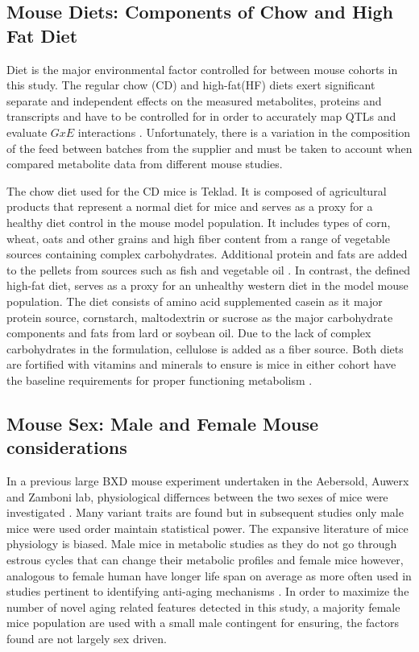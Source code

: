 \documentclass[a4paper,11pt,twoside]{book}
\begin{document}
	\subsection{Mouse Diets: Components of Chow and High Fat Diet}
	
    Diet is the major environmental factor controlled for between mouse cohorts in this study. The regular chow (CD) and high-fat(HF) diets exert significant separate and independent effects on the measured metabolites, proteins and transcripts and have to be controlled for in order to accurately map QTLs and evaluate $GxE$ interactions \citep{Warden2008}. Unfortunately, there is a variation in the composition of the feed between batches from the supplier and must be taken to account when compared metabolite data from different mouse studies.

	The chow diet used for the CD mice is Teklad. It is composed of agricultural products that represent a normal diet for mice and serves as a proxy for a healthy diet control in the mouse model population. It includes types of corn, wheat, oats and other grains and high fiber content from a range of vegetable sources containing complex carbohydrates\citep{Warden2008}. Additional protein and fats are added to the pellets from sources such as fish and vegetable oil \citep{Warden2008}. In contrast, the defined high-fat diet, serves as a proxy for an unhealthy western diet in the model mouse population. The diet consists of amino acid supplemented casein as it major protein source, cornstarch, maltodextrin or sucrose as the major carbohydrate components and fats from lard or soybean oil. Due to the lack of complex carbohydrates in the formulation, cellulose is added as a fiber source. Both diets are fortified with vitamins and minerals to ensure is mice in either cohort have the baseline requirements for proper functioning metabolism \citep{Warden2008}. 

	
	\subsection{Mouse Sex: Male and Female Mouse considerations}
	
	In a previous large BXD mouse experiment undertaken in the Aebersold, Auwerx and Zamboni lab, physiological differnces between the two sexes of mice were investigated \citep{Andreux2012SystemsTraits}. Many variant traits are found but in subsequent studies only male mice were used order maintain statistical power. The expansive literature of mice physiology is biased. Male mice in metabolic studies as they do not go through estrous cycles that can change their metabolic profiles\citep{Zucker2010MalesStudies} and female mice however, analogous to female human have longer life span on average as more often used in studies pertinent to identifying anti-aging mechanisms \citep{Yuan2011Miceaging}. In order to maximize the number of novel aging related features detected in this study, a majority female mice population are used with a small male contingent for ensuring, the factors found are not largely sex driven.
	
\end{document}
